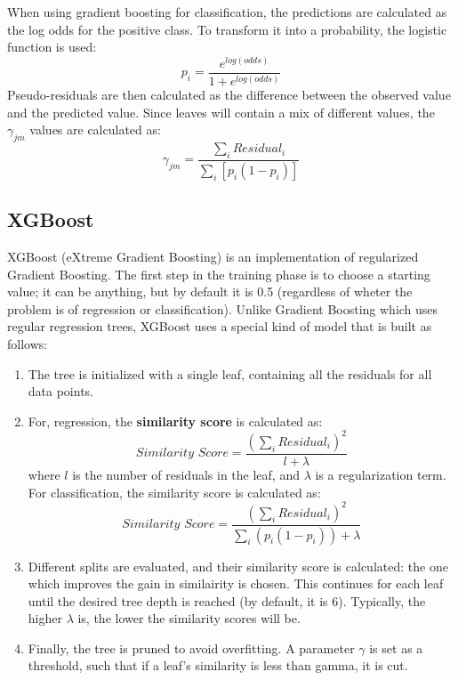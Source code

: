 When using gradient boosting for classification, the predictions are calculated as the log odds for the positive class. To transform it into a probability, the logistic function is used:
\begin{equation*}
    p_i = \dfrac{e^{log(\textit{odds})}}{1+e^{log(\textit{odds})}}
\end{equation*}
Pseudo-residuals are then calculated as the difference between the observed value and the predicted value. Since leaves will contain a mix of different values, the $\gamma_{jm}$ values are calculated as:
\begin{equation*}
    \gamma_{jm} = \dfrac{\sum_i \textit{Residual}_i}{\sum_i \left [ p_i(1-p_i) \right ]}
 \end{equation*}

\subsection{XGBoost}

XGBoost (eXtreme Gradient Boosting) is an implementation of regularized Gradient Boosting. The first step in the training phase is to choose a starting value; it can be anything, but by default it is 0.5 (regardless of wheter the problem is of regression or classification). Unlike Gradient Boosting which uses regular regression trees, XGBoost uses a special kind of model that is built as follows:
\begin{enumerate}
    \item The tree is initialized with a single leaf, containing all the residuals for all data points.
    
    \item For, regression, the \textbf{similarity score} is calculated as:
        \begin{equation*}
            \textit{Similarity Score} = \dfrac{(\sum_i \textit{Residual}_i)^2}{l + \lambda}
        \end{equation*}
    where $l$ is the number of residuals in the leaf, and $\lambda$ is a regularization term.
    For classification, the similarity score is calculated as:
    \begin{equation*}
        \textit{Similarity Score} = \dfrac{(\sum_i \textit{Residual}_i)^2}{\sum_i(p_i (1-p_i)) + \lambda}
    \end{equation*}

    \item Different splits are evaluated, and their similarity score is calculated: the one which improves the gain in similairity is chosen. This continues for each leaf until the desired tree depth is reached (by default, it is 6). Typically, the higher $\lambda$ is, the lower the similarity scores will be.
    
    \item Finally, the tree is pruned to avoid overfitting. A parameter $\gamma$ is set as a threshold, such that if a leaf's similarity is less than gamma, it is cut.
\end{enumerate}

